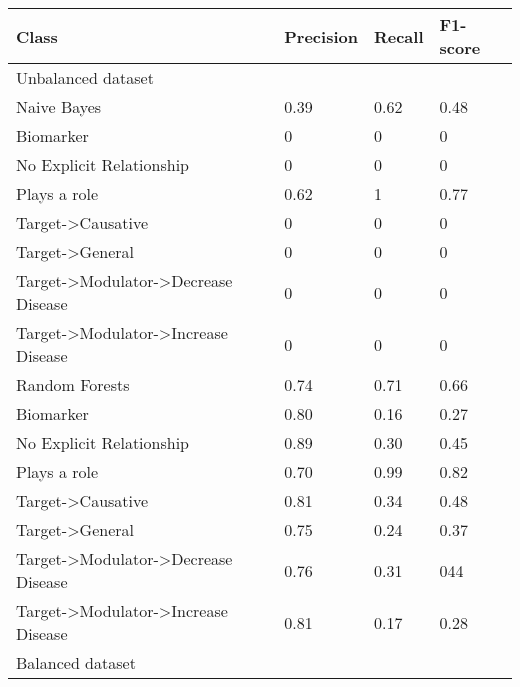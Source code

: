 \documentclass[final,12pt,3p,times,twocolumn,authoryear]{elsarticle}
\begin{document}
\begin{table*}[!]
    \centering
    \begin{tabular}{|l|l|l|l|}
    \hline
        Class & Precision & Recall & F1-score \\ \hline
        \multicolumn{4}{|l|}{Unbalanced dataset}   \\  \hline
        \hspace*{3mm} Naive Bayes &  0.39 & 0.62 & 0.48 \\
        \hspace*{6mm} Biomarker & 0 & 0 & 0 \\
        \hspace*{6mm} No Explicit Relationship   & 0 & 0 & 0 \\
        \hspace*{6mm} Plays a role & 0.62 & 1 & 0.77 \\
        \hspace*{6mm} Target-\textgreater Causative  & 0 & 0 & 0\\
        \hspace*{6mm} Target-\textgreater General        & 0 & 0 & 0 \\
        \hspace*{6mm} Target-\textgreater Modulator-\textgreater Decrease Disease & 0 & 0 & 0 \\
        \hspace*{6mm} Target-\textgreater Modulator-\textgreater Increase Disease   &0 & 0 & 0 \\
        \hline
        \hspace*{3mm} Random Forests &  0.74 & 0.71 & 0.66  \\
        \hspace*{6mm} Biomarker & 0.80 & 0.16 & 0.27 \\
        \hspace*{6mm} No Explicit Relationship   & 0.89 & 0.30 & 0.45  \\
        \hspace*{6mm} Plays a role & 0.70 & 0.99 & 0.82 \\
        \hspace*{6mm} Target-\textgreater Causative  & 0.81 & 0.34 & 0.48 \\
        \hspace*{6mm} Target-\textgreater General        & 0.75 & 0.24 & 0.37\\
        \hspace*{6mm} Target-\textgreater Modulator-\textgreater Decrease Disease & 0.76 & 0.31 & 044 \\ 
        \hspace*{6mm} Target-\textgreater Modulator-\textgreater Increase Disease   &0.81  & 0.17 & 0.28 \\
        \hline
         \multicolumn{4}{|l|}{Balanced dataset}  \\  \hline
        

\end{tabular}
\end{table*}
\end{document}

